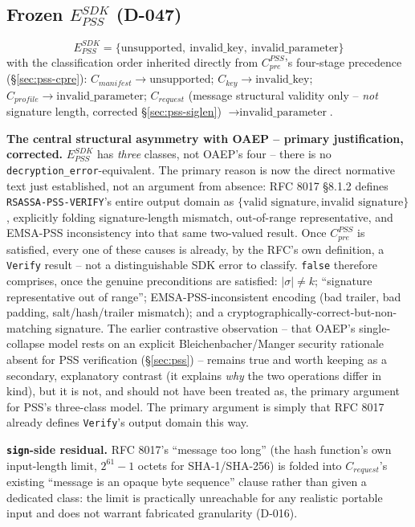 \documentclass[11pt,a4paper]{article}
\begin{document}
\subsection{Frozen \texorpdfstring{$E_{PSS}^{SDK}$}{E PSS SDK} (D-047)}\label{sec:pss-error-model}
\[E_{PSS}^{SDK} = \{\text{unsupported},\ \text{invalid\_key},\ \text{invalid\_parameter}\}\]
with the classification order inherited directly from $C_{pre}^{PSS}$'s four-stage precedence (\S\ref{sec:pss-cpre}): $C_{manifest} \to \text{unsupported}$; $C_{key} \to \text{invalid\_key}$; $C_{profile} \to \text{invalid\_parameter}$; $C_{request}$ (message structural validity only -- \emph{not} signature length, corrected \S\ref{sec:pss-siglen}) $\to \text{invalid\_parameter}$.

\textbf{The central structural asymmetry with OAEP -- primary justification, corrected.} $E_{PSS}^{SDK}$ has \emph{three} classes, not OAEP's four -- there is no \texttt{decryption\_error}-equivalent. The primary reason is now the direct normative text just established, not an argument from absence: RFC 8017 \S8.1.2 defines \texttt{RSASSA-PSS-VERIFY}'s entire output domain as $\{\text{valid signature}, \text{invalid signature}\}$, explicitly folding signature-length mismatch, out-of-range representative, and EMSA-PSS inconsistency into that same two-valued result. Once $C_{pre}^{PSS}$ is satisfied, every one of these causes is already, by the RFC's own definition, a \texttt{Verify} result -- not a distinguishable SDK error to classify. \texttt{false} therefore comprises, once the genuine preconditions are satisfied: $|\sigma| \neq k$; ``signature representative out of range''; EMSA-PSS-inconsistent encoding (bad trailer, bad padding, salt/hash/trailer mismatch); and a cryptographically-correct-but-non-matching signature. The earlier contrastive observation -- that OAEP's single-collapse model rests on an explicit Bleichenbacher/Manger security rationale absent for PSS verification (\S\ref{sec:pss}) -- remains true and worth keeping as a secondary, explanatory contrast (it explains \emph{why} the two operations differ in kind), but it is not, and should not have been treated as, the primary argument for PSS's three-class model. The primary argument is simply that RFC 8017 already defines \texttt{Verify}'s output domain this way.

\textbf{\texttt{sign}-side residual.} RFC 8017's ``message too long'' (the hash function's own input-length limit, $2^{61}-1$ octets for SHA-1/SHA-256) is folded into $C_{request}$'s existing ``message is an opaque byte sequence'' clause rather than given a dedicated class: the limit is practically unreachable for any realistic portable input and does not warrant fabricated granularity (D-016).
\end{document}
